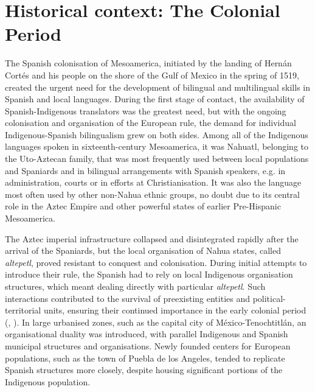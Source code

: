\documentclass[output=paper,hidelinks]{langscibook}
\begin{document}
\section{Historical context: The Colonial Period}

The Spanish colonisation of Mesoamerica, initiated by the landing of Hernán Cortés and his people on the shore of the Gulf of Mexico in the spring of 1519, created the urgent need for the development of bilingual and multilingual skills in Spanish and local languages. During the first stage of contact, the availability of Spanish-Indigenous translators was the greatest need, but with the ongoing colonisation and organisation of the European rule, the demand for individual Indigenous-Spanish bilingualism grew on both sides. Among all of the Indigenous languages spoken in sixteenth-century Mesoamerica, it was Nahuatl, belonging to the Uto-Aztecan family, that was most frequently used between local populations and Spaniards and in bilingual arrangements with Spanish speakers, e.g. in administration, courts or in efforts at Christianisation. It was also the language most often used by other non-Nahua ethnic groups, no doubt due to its central role in the Aztec Empire and other powerful states of earlier Pre-Hispanic Mesoamerica.

The Aztec imperial infrastructure collapsed and disintegrated rapidly after the arrival of the Spaniards, but the local organisation of Nahua states, called \textit{altepetl}, proved resistant to conquest and colonisation. During initial attempts to introduce their rule, the Spanish had to rely on local Indigenous organisation structures, which meant dealing directly with particular \textit{altepetl}. Such interactions contributed to the survival of preexisting entities and political-territorial units, ensuring their continued importance in the early colonial period (\citealt[63--74]{gibson1964}, \citealt[28--29]{lockhart1992}). In large urbanised zones, such as the capital city of México-Tenochtitlán, an organisational duality was introduced, with parallel Indigenous and Spanish municipal structures and organisations. Newly founded centers for European populations, such as the town of Puebla de los Angeles, tended to replicate Spanish structures more closely, despite housing significant portions of the Indigenous population.
\end{document}
